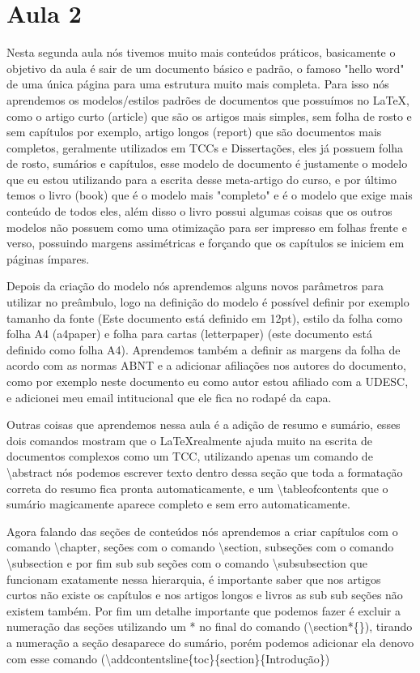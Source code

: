 \section{Aula 2}
Nesta segunda aula nós tivemos muito mais conteúdos práticos, basicamente o objetivo da aula é sair de um documento básico e padrão, o famoso "hello word" de uma única página para uma estrutura muito mais completa. Para isso nós aprendemos os modelos/estilos padrões de documentos que possuímos no \LaTeX, como o artigo curto (article) que são os artigos mais simples, sem folha de rosto e sem capítulos por exemplo, artigo longos (report) que são documentos mais completos, geralmente utilizados em TCCs e Dissertações, eles já possuem folha de rosto, sumários e capítulos, esse modelo de documento é justamente o modelo que eu estou utilizando para a escrita desse meta-artigo do curso, e por último temos o livro (book) que é o modelo mais "completo" e é o modelo que exige mais conteúdo de todos eles, além disso o livro possui algumas coisas que os outros modelos não possuem como uma otimização para ser impresso em folhas frente e verso, possuindo margens assimétricas e forçando que os capítulos se iniciem em páginas ímpares.

Depois da criação do modelo nós aprendemos alguns novos parâmetros para utilizar no preâmbulo, logo na definição do modelo é possível definir por exemplo tamanho da fonte (Este documento está definido em 12pt), estilo da folha como folha A4 (a4paper) e folha para cartas (letterpaper) (este documento está definido como folha A4). Aprendemos também a definir as margens da folha de acordo com as normas ABNT e a adicionar afiliações nos autores do documento, como por exemplo neste documento eu como autor estou afiliado com a UDESC, e adicionei meu email intitucional que ele fica no rodapé da capa.

Outras coisas que aprendemos nessa aula é a adição de resumo e sumário, esses dois comandos mostram que o \LaTeX realmente ajuda muito na escrita de documentos complexos como um TCC, utilizando apenas um comando de \textbackslash abstract nós podemos escrever texto dentro dessa seção que toda a formatação correta do resumo fica pronta automaticamente, e um \textbackslash tableofcontents que o sumário magicamente aparece completo e sem erro automaticamente.

Agora falando das seções de conteúdos nós aprendemos a criar capítulos com o comando \textbackslash chapter, seções com o comando \textbackslash section, subseções com o comando \textbackslash subsection e por fim sub sub seções com o comando \textbackslash subsubsection que funcionam exatamente nessa hierarquia, é importante saber que nos artigos curtos não existe os capítulos e nos artigos longos e livros as sub sub seções não existem também. Por fim um detalhe importante que podemos fazer é excluir a numeração das seções utilizando um * no final do comando (\textbackslash section*\{\}), tirando a numeração a seção desaparece do sumário, porém podemos adicionar ela denovo com esse comando (\textbackslash addcontentsline\{toc\}\{section\}\{Introdução\})

